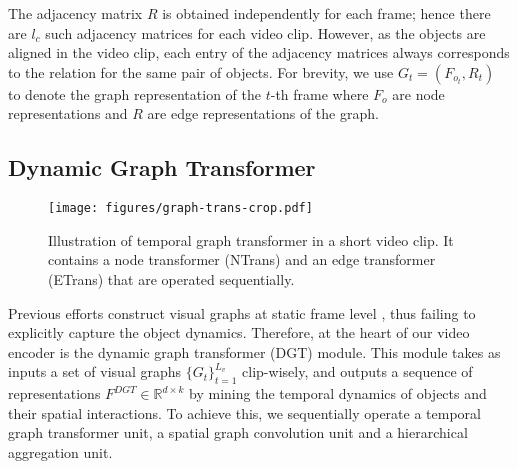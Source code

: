 \documentclass[10pt,journal,compsoc]{IEEEtran}
\begin{document}
The adjacency matrix $R$ is obtained independently for each frame; hence there are $l_c$ such adjacency matrices for each video clip.  However, as the objects are aligned in the video clip, each entry of the adjacency matrices always corresponds to the relation for the same pair of objects. For brevity, we use $G_t=(F_{o_t}, R_t)$ to denote the graph representation of the $t$-th frame where $F_{o}$ are node representations and $R$ are edge representations of the graph.

\subsection{Dynamic Graph Transformer}
\label{sec:dgt}
\begin{figure}[t]
  \begin{center}
    \texttt{[image: figures/graph-trans-crop.pdf]}
  \end{center}
  \vspace{-0.3cm}
  \caption{Illustration of temporal graph transformer in a short video clip. It contains a node transformer (NTrans) and an edge transformer (ETrans) that are operated sequentially. }
  \vspace{-0.4cm}
  \label{fig:dgt}
\end{figure}
Previous efforts construct visual graphs at static frame level \cite{xiao2021video, peng2021progressive,liu2021hair}, thus failing to explicitly capture the object dynamics. Therefore, at the heart of our video encoder is the dynamic graph transformer (DGT) module. This module takes as inputs a set of visual graphs $\{G_t\}_{t=1}^{L_v}$ clip-wisely, and outputs a sequence of representations $F^{DGT}\in\mathbb{R}^{d\times k}$ by mining the temporal dynamics of objects and their spatial interactions. To achieve this, we sequentially operate a temporal graph transformer unit, a spatial graph convolution unit and a hierarchical aggregation unit. 
\end{document}
